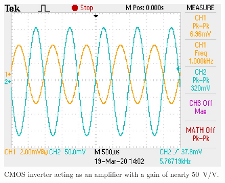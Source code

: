 \documentclass{report}
\begin{document}
\begin{figure}[H]
	\centering
	\includegraphics[width=0.4\linewidth]{exp3scope}
	\caption{CMOS inverter acting as an amplifier with a gain of nearly \SI{50}{\V/\V}.}
	\label{fig:exp3scope}
\end{figure}
\end{document}
